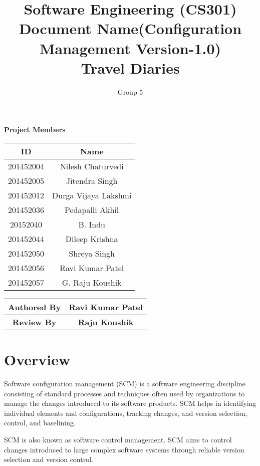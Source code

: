 \documentclass[]{article}
\title{Software Engineering (CS301)\\ Document Name(Configuration Management Version-1.0)\\Travel Diaries}
\author{Group 5}
\begin{document}
\maketitle


\begin{center}
\textbf{Project Members}\\
\vspace*{.6cm}
\begin{tabular}{|c|c|}
\hline
\textbf{ID} & \textbf{Name}\\
\hline
\hline
201452004 & Nilesh Chaturvedi\\
\hline
201452005 & Jitendra Singh\\
\hline
201452012 & Durga Vijaya Lakshmi\\
\hline
201452036 & Pedapalli Akhil\\
\hline
20152040 & B. Indu\\
\hline
201452044 & Dileep Krishna\\
\hline
201452050 & Shreya Singh\\
\hline
201452056 & Ravi Kumar Patel\\
\hline
201452057 & G. Raju Koushik\\
\hline
\end{tabular}

\vspace*{1cm}

\begin{tabular}{|c|c|}
\hline
\textbf{Authored By} & \textbf{Ravi Kumar Patel}\\
\hline
\textbf{Review By} & \textbf{Raju Koushik }\\
\hline

\end{tabular}
\end{center}

\newpage
\tableofcontents
\newpage

\section{Overview}
Software configuration management (SCM) is a software engineering discipline consisting of standard processes and techniques often used by organizations to manage the changes introduced to its software products. SCM helps in identifying individual elements and configurations, tracking changes, and version selection, control, and baselining.

SCM is also known as software control management. SCM aims to control changes introduced to large complex software systems through reliable version selection and version control.
\end{document}

